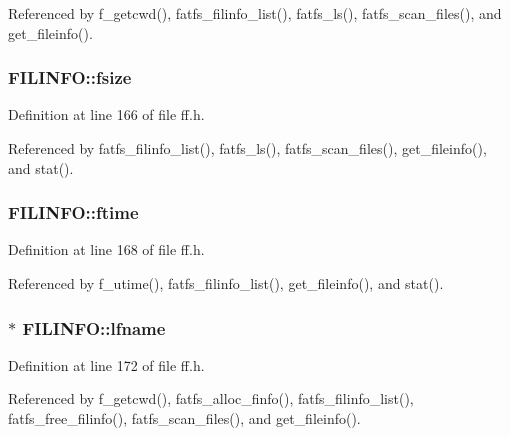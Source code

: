 Referenced by f\+\_\+getcwd(), fatfs\+\_\+filinfo\+\_\+list(), fatfs\+\_\+ls(), fatfs\+\_\+scan\+\_\+files(), and get\+\_\+fileinfo().

\subsubsection[{\texorpdfstring{fsize}{fsize}}]{ F\+I\+L\+I\+N\+F\+O\+::fsize}\hypertarget{structFILINFO_aee7441af7dc0c443d1e1e6011cc7dcac}{}\label{structFILINFO_aee7441af7dc0c443d1e1e6011cc7dcac}


Definition at line 166 of file ff.\+h.



Referenced by fatfs\+\_\+filinfo\+\_\+list(), fatfs\+\_\+ls(), fatfs\+\_\+scan\+\_\+files(), get\+\_\+fileinfo(), and stat().

\subsubsection[{\texorpdfstring{ftime}{ftime}}]{ F\+I\+L\+I\+N\+F\+O\+::ftime}\hypertarget{structFILINFO_ae0f751b79621bf7b29669f177bbe6b9a}{}\label{structFILINFO_ae0f751b79621bf7b29669f177bbe6b9a}


Definition at line 168 of file ff.\+h.



Referenced by f\+\_\+utime(), fatfs\+\_\+filinfo\+\_\+list(), get\+\_\+fileinfo(), and stat().

\subsubsection[{\texorpdfstring{lfname}{lfname}}]{$\ast$ F\+I\+L\+I\+N\+F\+O\+::lfname}\hypertarget{structFILINFO_ac4506c29e0219130dff46b01a1b5c023}{}\label{structFILINFO_ac4506c29e0219130dff46b01a1b5c023}


Definition at line 172 of file ff.\+h.



Referenced by f\+\_\+getcwd(), fatfs\+\_\+alloc\+\_\+finfo(), fatfs\+\_\+filinfo\+\_\+list(), fatfs\+\_\+free\+\_\+filinfo(), fatfs\+\_\+scan\+\_\+files(), and get\+\_\+fileinfo().

